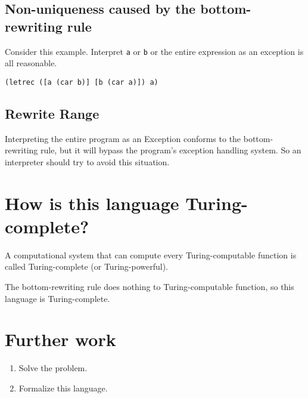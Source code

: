 \documentclass[11pt,preprint,numbers]{sigplanconf}
\begin{document}
\subsection{Non-uniqueness caused by the bottom-rewriting rule}

Consider this example. Interpret {\scriptsize\verb|a|} or {\scriptsize\verb|b|} or the entire expression as an exception is all reasonable.
\lstset{language=Lisp}
\begin{lstlisting}[frame=single]
(letrec ([a (car b)] [b (car a)]) a)
\end{lstlisting}

\subsection{Rewrite Range}

Interpreting the entire program as an Exception conforms to the bottom-rewriting rule, but it will bypass the program's exception handling system. So an interpreter should try to avoid this situation.

\section{How is this language Turing-complete?}

A computational system that can compute every Turing-computable function is called Turing-complete (or Turing-powerful).~\citep{wikipedia_Turing_completeness}

The bottom-rewriting rule does nothing to Turing-computable function, so this language is Turing-complete.

\section{Further work}

\begin{enumerate}
\item Solve the problem.
\item Formalize this language.
\end{enumerate}



\end{document}
